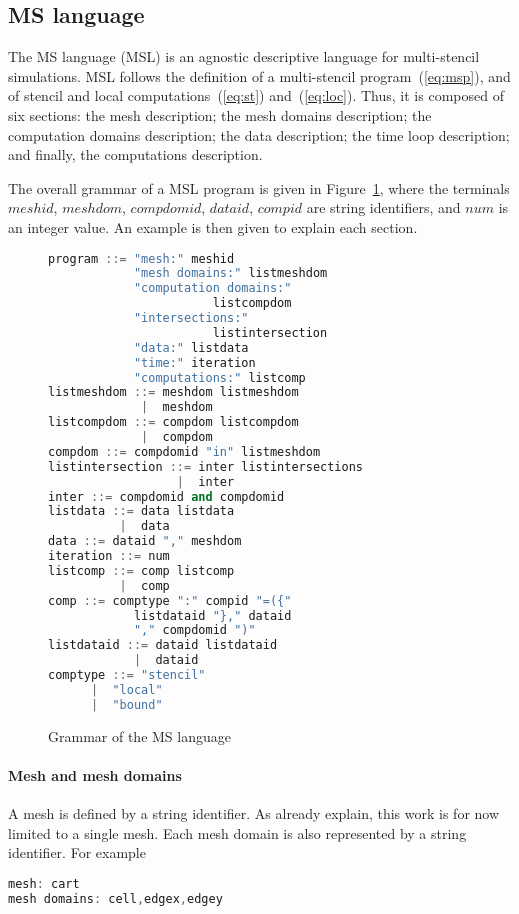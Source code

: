 \subsection{MS language}
The MS language (MSL) is an agnostic descriptive language for multi-stencil simulations. MSL follows the definition of a multi-stencil program~(\ref{eq:msp}), and of stencil and local computations~(\ref{eq:st}) and~(\ref{eq:loc}). Thus, it is composed of six sections: the mesh description; the mesh domains description; the computation domains description; the data description; the time loop description; and finally, the computations description.

The overall grammar of a MSL program is given in Figure~\ref{fig:grammar}, where the terminals $meshid$, $meshdom$, $compdomid$, $dataid$, $compid$ are string identifiers, and $num$ is an integer value. An example is then given to explain each section.

\begin{figure}[h!]
\begin{lstlisting}[basicstyle=\small,mathescape,frame=single,language=C++]
program ::= "mesh:" meshid 
            "mesh domains:" listmeshdom
            "computation domains:" 
                       listcompdom
            "intersections:"
                       listintersection
            "data:" listdata
            "time:" iteration
            "computations:" listcomp
listmeshdom ::= meshdom listmeshdom
             |  meshdom
listcompdom ::= compdom listcompdom
             |  compdom
compdom ::= compdomid "in" listmeshdom
listintersection ::= inter listintersections
                  |  inter
inter ::= compdomid and compdomid
listdata ::= data listdata
          |  data
data ::= dataid "," meshdom
iteration ::= num
listcomp ::= comp listcomp
          |  comp
comp ::= comptype ":" compid "=({" 
            listdataid "}," dataid 
            "," compdomid ")"
listdataid ::= dataid listdataid
            |  dataid
comptype ::= "stencil"
      |  "local"
      |  "bound"
\end{lstlisting}
\caption{Grammar of the MS language}
\label{fig:grammar}
\end{figure}

\paragraph{Mesh and mesh domains} A mesh is defined by a string identifier. As already explain, this work is for now limited to a single mesh. Each mesh domain is also represented by a string identifier. For example
\begin{lstlisting}[basicstyle=\small,mathescape,frame=single,language=C++]
mesh: cart
mesh domains: cell,edgex,edgey
\end{lstlisting}

